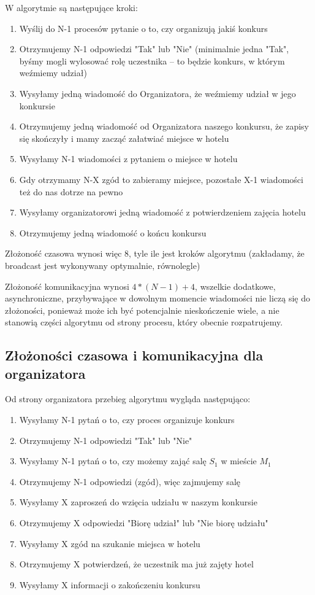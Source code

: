 \documentclass{article}
\begin{document}
W algorytmie są następujące kroki:

\begin{enumerate}
\item Wyślij do N-1 procesów pytanie o to, czy organizują jakiś konkurs
\item Otrzymujemy N-1 odpowiedzi "Tak" lub "Nie" (minimalnie jedna "Tak", byśmy mogli wylosować rolę uczestnika -- to będzie konkurs, w którym weźmiemy udział)
\item Wysyłamy jedną wiadomość do Organizatora, że weźmiemy udział w jego konkursie
\item Otrzymujemy jedną wiadomość od Organizatora naszego konkursu, że zapisy się skończyły i mamy zacząć załatwiać miejsce w hotelu
\item Wysyłamy N-1 wiadomości z pytaniem o miejsce w hotelu
\item Gdy otrzymamy N-X zgód to zabieramy miejsce, pozostałe X-1 wiadomości też do nas dotrze na pewno
\item Wysyłamy organizatorowi jedną wiadomość z potwierdzeniem zajęcia hotelu
\item Otrzymujemy jedną wiadomość o końcu konkursu
\end{enumerate}

Złożoność czasowa wynosi więc 8, tyle ile jest kroków algorytmu (zakładamy, że broadcast jest wykonywany optymalnie, równolegle)

Złożoność komunikacyjna wynosi $4 * (N - 1) + 4$, wszelkie dodatkowe, asynchroniczne, przybywające w dowolnym momencie wiadomości nie liczą się do złożoności, ponieważ może ich być potencjalnie nieskończenie wiele, a nie stanowią części algorytmu od strony procesu, który obecnie rozpatrujemy.

\subsection{Złożoności czasowa i komunikacyjna dla organizatora}

Od strony organizatora przebieg algorytmu wygląda następująco:

\begin{enumerate}
\item Wysyłamy N-1 pytań o to, czy proces organizuje konkurs
\item Otrzymujemy N-1 odpowiedzi "Tak" lub "Nie"
\item Wysyłamy N-1 pytań o to, czy możemy zająć salę $S_{1}$ w mieście $M_{1}$
\item Otrzymujemy N-1 odpowiedzi (zgód), więc zajmujemy salę
\item Wysyłamy X zaproszeń do wzięcia udziału w naszym konkursie
\item Otrzymujemy X odpowiedzi "Biorę udział" lub "Nie biorę udziału"
\item Wysyłamy X zgód na szukanie miejsca w hotelu
\item Otrzymujemy X potwierdzeń, że uczestnik ma już zajęty hotel
\item Wysyłamy X informacji o zakończeniu konkursu
\end{enumerate}
\end{document}

